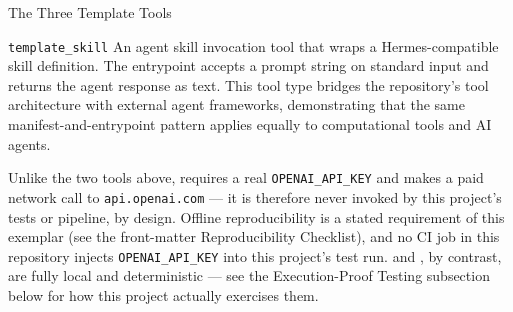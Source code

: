 \documentclass[
  ignorenonframetext,
]{beamer}
\begin{document}
\begin{frame}{The Three Template Tools}
\begin{block}{\texttt{template\_skill}}
\protect{}\label{template_skill}
An agent skill invocation tool that wraps a Hermes-compatible skill
definition. The entrypoint  accepts a prompt
string on standard input and returns the agent response as text. This
tool type bridges the repository's tool architecture with external agent
frameworks, demonstrating that the same manifest-and-entrypoint pattern
applies equally to computational tools and AI agents.

Unlike the two tools above,  requires a real
\texttt{OPENAI\_API\_KEY} and makes a paid network call to
\texttt{api.openai.com} --- it is therefore never invoked by this
project's tests or pipeline, by design. Offline reproducibility is a
stated requirement of this exemplar (see the front-matter
Reproducibility Checklist), and no CI job in this repository injects
\texttt{OPENAI\_API\_KEY} into this project's test run.
 and , by
contrast, are fully local and deterministic --- see the Execution-Proof
Testing subsection below for how this project actually exercises them.
\end{block}
\end{frame}
\end{document}
